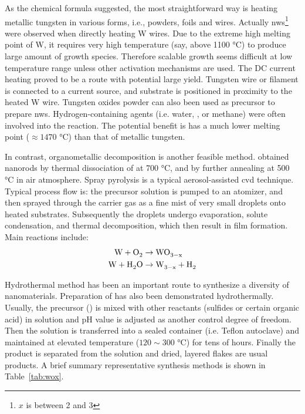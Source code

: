 As the chemical formula  suggested, the most straightforward way is heating metallic tungsten in various forms,\cite{Zhou2005a,Cao2009,Hsieh2010} i.e., powders, foils and wires. Actually  \glspl{nw}\footnote{$x$ is between 2 and 3} were observed when directly heating W wires.\cite{Gu2002a} Due to the extreme high melting point of W, it requires very high temperature (say, above 1100 \si{\degreeCelsius}) to produce large amount of growth species. Therefore scalable growth seems difficult at low temperature range unless other activation mechanisms are used. The DC current heating proved to be a route with potential large yield. Tungsten wire or filament is connected to a current source, and substrate is positioned in proximity to the heated W wire.\cite{Lingfei2006,Thangala2007,Chang2007} Tungsten oxides powder can also been used as precursor to prepare  \glspl{nw}.\cite{Huang2008a,Wang2009} Hydrogen-containing agents (i.e. water, , or methane\cite{Klinke2005}) were often involved into the reaction.\cite{Baek2007,Karuppanan2007} The potential benefit is  has a much lower melting point ($\approx 1470$ \si{\degreeCelsius}) than that of metallic tungsten.

In contrast, organometallic decomposition is another feasible method. \citeauthor{Pol2005} obtained  nanorods by thermal dissociation of  at 700 \si{\degreeCelsius}, and  by further annealing at 500 \si{\degreeCelsius} in air atmosphere.\cite{Pol2005} Spray pyrolysis is a typical aerosol-assisted \gls{cvd} technique. Typical process flow is: the precursor solution is pumped to an atomizer, and then sprayed through the carrier gas as a fine mist of very small droplets onto heated substrates. Subsequently the droplets undergo evaporation, solute condensation, and thermal decomposition, which then result in film formation.\cite{Zheng2011} Main reactions include:
\begin{align}
\cee{W + O2 &\rightarrow WO_{3-x}\\
W + H2O &\rightarrow  W_{3-x} + H2}
\end{align}

Hydrothermal method has been an important route to synthesize a diversity of nanomaterials. Preparation of  has also been demonstrated hydrothermally.\cite{Lee2003,Gu2007} Usually, the precursor () is mixed with other reactants (sulfides or certain organic acid) in solution and pH value is adjusted as another control degree of freedom. Then the solution is transferred into a sealed container (i.e. Teflon autoclave) and maintained at elevated temperature ($120 \sim 300$ \si{\degreeCelsius}) for tens of hours. Finally the product is separated from the solution and dried, layered  flakes are usual products. A brief summary representative synthesis methods is shown in Table~\ref{tab:wox}.

